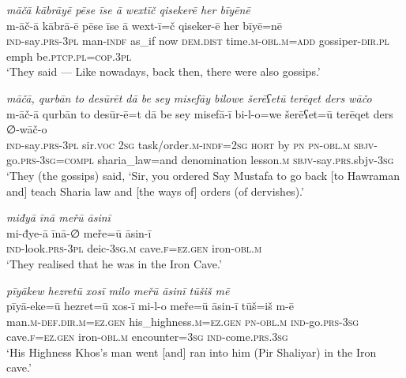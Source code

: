 \ea \label{ŽP.125}
\textit{māčā kābrāyē pēse īse ā wextīč qisekerē her bīyēnē} \\ 
\gll m-āč-ā kābrā-ē pēse īse ā wext-ī=č qiseker-ē her bīyē=nē \\ 
 \textsc{ind-}say\textsc{.prs}\textsc{-3pl} man\textsc{-indf} as\_if now \textsc{dem.dist} time\textsc{.m}\textsc{-obl}\textsc{.m}\textsc{=add} gossiper\textsc{-dir}\textsc{.pl} emph be\textsc{.ptcp}\textsc{.pl}\textsc{=cop}\textsc{.3pl} \\ 
\glt `They said — Like nowadays, back then, there were also gossips.'
\z 
 
\ea \label{ŽP.126}
\textit{māčā, qurbān to desūrēt dā be sey misefāy bilowe šerēʕetū terēqet ders wāčo} \\ 
\gll m-āč-ā qurbān to desūr-ē=t dā be sey misefā-ī bi-l-o=we šerēʕet=ū terēqet ders ∅-wāč-o \\ 
 \textsc{ind-}say\textsc{.prs}\textsc{-3pl} sir.\textsc{voc} \textsc{2sg} task/order\textsc{.m}\textsc{-indf}\textsc{=\textsc{2sg}} \textsc{hort} by \textsc{pn} \textsc{pn}\textsc{-obl}\textsc{.m} \textsc{sbjv-}go\textsc{.prs}\textsc{-3sg}\textsc{=compl} sharia\_law=and denomination lesson\textsc{.m} \textsc{sbjv-}say\textsc{.prs}.sbjv\textsc{-3sg} \\ 
\glt `They (the gossips) said, ‘Sir, you ordered Say Mustafa to go back [to Hawraman and] teach Sharia law and [the ways of] orders (of dervishes).'
\z 
 
\ea \label{ŽP.131}
\textit{miđyā īnā meřū āsinī} \\ 
\gll mi-đye-ā īnā-∅ meře=ū āsin-ī \\ 
 \textsc{ind-}look\textsc{.prs}\textsc{-3pl} deic\textsc{-3sg}\textsc{.m} cave\textsc{.f}\textsc{\textsc{=ez.gen}} iron\textsc{-obl}\textsc{.m} \\ 
\glt `They realised that he was in the Iron Cave.'
\z 
 
\ea \label{ŽP.132}
\textit{pīyākew hezretū xosī milo meřū āsinī tūšiš mē} \\ 
\gll pīyā-eke=ū hezret=ū xos-ī mi-l-o meře=ū āsin-ī tūš=iš m-ē \\ 
 man\textsc{.m}\textsc{-def}\textsc{.dir}\textsc{.m}\textsc{\textsc{=ez.gen}} his\_highness\textsc{.m}\textsc{\textsc{=ez.gen}} \textsc{pn}\textsc{-obl}\textsc{.m} \textsc{ind-}go\textsc{.prs}\textsc{-3sg} cave\textsc{.f}\textsc{\textsc{=ez.gen}} iron\textsc{-obl}\textsc{.m} encounter\textsc{=3sg} \textsc{ind-}come\textsc{.prs}\textsc{.3sg} \\ 
\glt `His Highness Khos’s man went [and] ran into him (Pir Shaliyar) in the Iron cave.'
\z 
 
